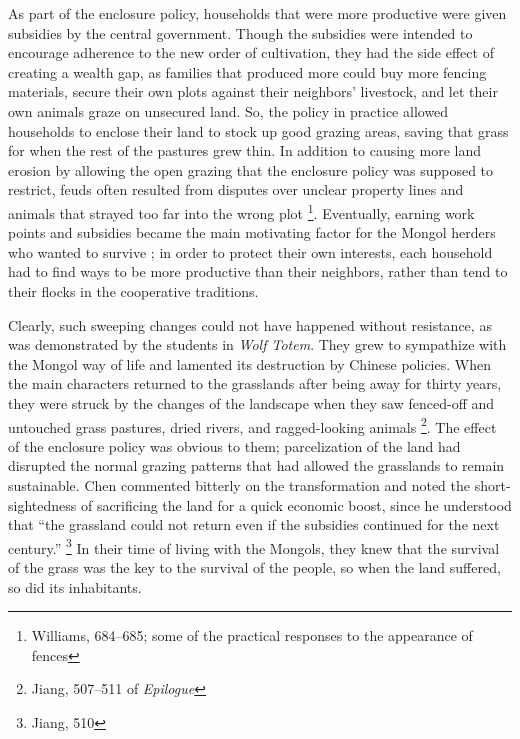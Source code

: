 As part of the enclosure policy, households that were more productive
were given subsidies by the central government. Though the subsidies
were intended to encourage adherence to the new order of cultivation,
they had the side effect of creating a wealth gap, as families that produced more could
buy more fencing materials, secure their own plots against their
neighbors' livestock, and let their own animals graze on unsecured
land. So, the policy in practice allowed households to enclose their
land to stock up good grazing areas, saving that grass for when the
rest of the pastures grew thin. In addition to causing more land
erosion by allowing the open grazing that the enclosure policy was
supposed to restrict, feuds often resulted from disputes over unclear property lines and
animals that strayed too far into the wrong plot \footnote{Williams, 684--685; some of the practical responses to the appearance of fences}.
Eventually, earning work points and subsidies became the main motivating
factor for the Mongol herders who wanted to survive
; in order to protect
their own interests, each household had to find ways to be more
productive than their neighbors, rather than tend to their flocks in the cooperative traditions.

Clearly, such sweeping changes could not have happened without resistance, as was
demonstrated by the students in \textit{Wolf Totem}. They grew to sympathize
with the Mongol way of life and lamented its destruction by Chinese
policies. When the main characters returned to the grasslands after being
away for thirty years, they were struck by the changes of the landscape when they saw
fenced-off and untouched grass pastures, dried rivers, and
ragged-looking animals \footnote{Jiang, 507--511 of \textit{Epilogue}}.
The effect of the enclosure policy was obvious to them; parcelization of the
land had disrupted the normal grazing patterns that had allowed the
grasslands to remain sustainable. Chen commented bitterly on the
transformation and noted the short-sightedness of sacrificing the land
for a quick economic boost, since he understood that ``the grassland could not return even if
the subsidies continued for the next century.'' \footnote{Jiang, 510} In their time  of living with the Mongols, they knew that the survival of the grass was the key to the survival of the people, so when the land suffered, so did its inhabitants.

